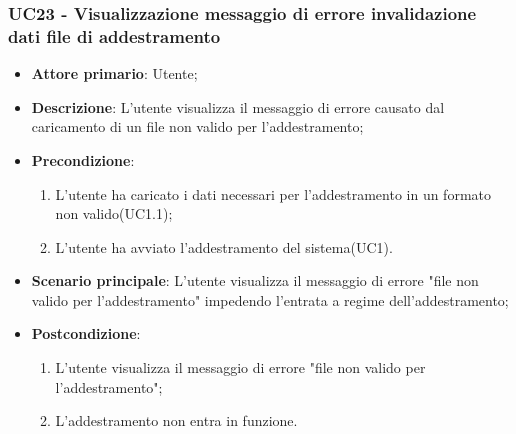 \subsubsection{UC23 - Visualizzazione messaggio di errore invalidazione dati file di addestramento}
\label{sssec:uc23}
\begin{itemize}
  \item \textbf{Attore primario}: Utente;
  \item \textbf{Descrizione}: L'utente visualizza il messaggio di errore causato dal caricamento di un file non valido per l'addestramento;
  \item \textbf{Precondizione}:
  \begin{enumerate}
		\item L'utente ha caricato i dati necessari per l'addestramento in un formato non valido(UC1.1);
		\item L'utente ha avviato l'addestramento del sistema(UC1).
	\end{enumerate}
  \item \textbf{Scenario principale}: L'utente visualizza il messaggio di errore "file non valido per l'addestramento" impedendo l'entrata a regime dell'addestramento;
  \item \textbf{Postcondizione}:
  \begin{enumerate}
		\item L'utente visualizza il messaggio di errore "file non valido per l'addestramento";
		\item L'addestramento non entra in funzione.
	\end{enumerate}
\end{itemize}
